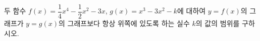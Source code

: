 두 함수 $f(x)=\dfrac{1}{4}x^4-\dfrac{1}{2}x^2-3x$, $g(x)=x^3-3x^2-k$에 대하여 $y=f(x)$의 그래프가 $y=g(x)$의 그래프보다 항상 위쪽에 있도록 하는 실수 $k$의 값의 범위를 구하시오.

